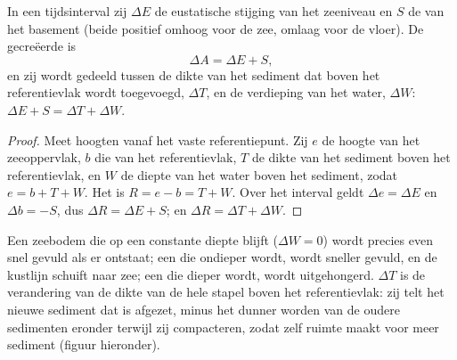 \begin{proposition}\label{prop:b1:diagenesis-basins:budget}
In een tijdsinterval zij $\Delta E$ de eustatische stijging van het zeeniveau en $S$ de  van het basement (beide positief omhoog voor de zee, omlaag voor de vloer). De gecreëerde  is
\[
  \Delta A = \Delta E + S ,
\]
en zij wordt gedeeld tussen de dikte van het sediment dat boven het referentievlak wordt toegevoegd, $\Delta T$, en de verdieping van het water, $\Delta W$:
$\Delta E + S = \Delta T + \Delta W$.
\end{proposition}

\begin{proof}
Meet hoogten vanaf het vaste referentiepunt. Zij $e$ de hoogte van het zeeoppervlak,
$b$ die van het referentievlak, $T$ de dikte van het sediment boven het referentievlak,
en $W$ de diepte van het water boven het sediment, zodat $e = b + T + W$. Het
 is $R = e - b = T + W$. Over het interval geldt $\Delta e =
\Delta E$ en $\Delta b = -S$, dus $\Delta R = \Delta E + S$; en $\Delta R =
\Delta T + \Delta W$.
\end{proof}

Een zeebodem die op een constante diepte blijft ($\Delta W = 0$) wordt precies even snel gevuld als er  ontstaat; een die ondieper wordt, wordt sneller gevuld, en de kustlijn schuift naar zee; een die dieper wordt, wordt uitgehongerd. $\Delta T$ is de verandering van de dikte van de hele stapel boven het referentievlak: zij telt het nieuwe sediment dat is afgezet, minus het dunner worden van de oudere sedimenten eronder terwijl zij compacteren, zodat  zelf ruimte maakt voor meer sediment (figuur hieronder).

